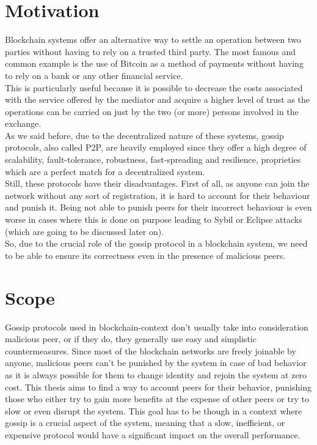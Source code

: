 \documentclass[mscthesis]{usiinfthesis}
\begin{document}
\section{Motivation}
Blockchain systems offer an alternative way to settle an operation between two parties without having to rely on a trusted third party. The most famous and common example is the use of Bitcoin as a method of payments without having to rely on a bank or any other financial service. \\
This is particularly useful because it is possible to decrease the costs associated with the service offered by the mediator and acquire a higher level of trust as the operations can be carried on just by the two (or more) persons involved in the exchange.  \\
As we said before, due to the decentralized nature of these systems, gossip protocols, also called P2P, are heavily employed since they offer a high degree of scalability, fault-tolerance, robustness, fast-spreading and resilience, proprieties which are a perfect match for a decentralized system. \\
Still, these protocols have their disadvantages. First of all, as anyone can join the network without any sort of registration, it is hard to account for their behaviour and punish it. Being not able to punish peers for their incorrect behaviour is even worse in cases where this is done on purpose leading to Sybil or Eclipse attacks (which are going to be discussed later on).\\
So, due to the crucial role of the gossip protocol in a blockchain system, we need to be able to ensure its correctness even in the presence of malicious peers.

\section{Scope}
Gossip protocols used in blockchain-context don't usually take into consideration malicious peer, or if they do, they generally use easy and simplistic countermeasures. 
Since most of the blockchain networks are freely joinable by anyone, malicious peers can't be punished by the system in case of bad behavior as it is always possible for them to change identity and rejoin the system at zero cost.
This thesis aims to find a way to account peers for their behavior, punishing those who either try to gain more benefits at the expense
of other peers or try to slow or even disrupt the system. This goal has to be though in a context where gossip is a crucial aspect of the system, meaning that a slow, inefficient, or expensive protocol would have a significant impact on the overall performance.
\end{document}
